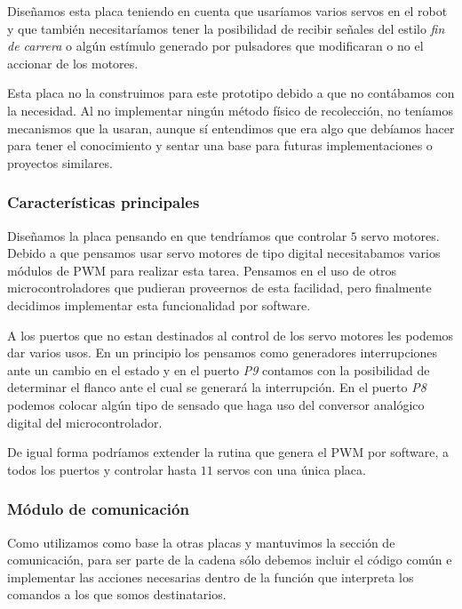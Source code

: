 Dise\~namos esta placa teniendo en cuenta que usar\'iamos varios servos en el robot y que tambi\'en
necesitar\'iamos tener la posibilidad de recibir se\~nales del estilo \emph{fin de carrera} o alg\'un
est\'imulo generado por pulsadores que modificaran o no el accionar de los motores.

Esta placa no la construimos para este prototipo debido a que no cont\'abamos con la necesidad.
Al no implementar ning\'un m\'etodo f\'isico de recolecci\'on, no ten\'iamos mecanismos que la
usaran, aunque s\'i entendimos que era algo que deb\'iamos hacer para tener el conocimiento y sentar
una base para futuras implementaciones o proyectos similares.

\subsubsection{Caracter\'isticas principales}
\label{h_placas_servos_caracteristicas}

Dise\~namos la placa pensando en que tendr\'iamos que controlar $5$ servo motores.
Debido a que pensamos usar servo motores de tipo digital necesitabamos varios m\'odulos de PWM para
realizar esta tarea.
Pensamos en el uso de otros microcontroladores que pudieran proveernos de esta facilidad, pero finalmente
decidimos implementar esta funcionalidad por software.

A los puertos que no estan destinados al control de los servo motores les podemos dar varios usos.
En un principio los pensamos como generadores interrupciones ante un cambio en el estado y en el
puerto \emph{P9} contamos con la posibilidad de determinar el flanco ante el cual se generar\'a la
interrupci\'on.
En el puerto \emph{P8} podemos colocar alg\'un tipo de sensado que haga uso del conversor anal\'ogico
digital del microcontrolador.

De igual forma podr\'iamos extender la rutina que genera el PWM por software, a todos los puertos y
controlar hasta $11$ servos con una \'unica placa.

\subsubsection{M\'odulo de comunicaci\'on}
\label{h_placas_servos_comm}

Como utilizamos como base la otras placas y mantuvimos la secci\'on de comunicaci\'on, para ser parte
de la cadena s\'olo debemos incluir el c\'odigo com\'un e implementar las acciones necesarias dentro
de la funci\'on que interpreta los comandos a los que somos destinatarios.

